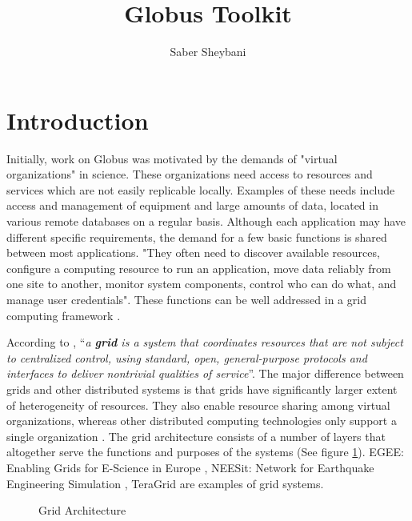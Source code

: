 \documentclass[9pt,twocolumn,twoside]{../../styles/osajnl}
\title{Globus Toolkit}
\author[1,*]{Saber Sheybani}
\affil[1]{School of Informatics and Computing, Bloomington, IN 47408, U.S.A.}
\affil[*]{Corresponding authors: sheybani@indiana.edu}
\begin{document}
 

\maketitle 

\section{Introduction} 

Initially, work on Globus was motivated by the demands of "virtual organizations" in science. These organizations need access to resources and services which are not easily replicable locally. Examples of these needs include access and management of equipment and large amounts of data, located in various remote databases on a regular basis. Although each application may have different specific requirements, the demand for a few basic functions is shared between most applications. "They often need to discover available resources, configure a computing resource to run an application, move data reliably from one site to another, monitor system components, control who can do what, and manage user credentials". These functions can be well addressed in a grid computing framework \cite{foster2006globus}.

According to \cite{sotomayor2006globus}, ``\emph{a \textbf{grid} is a system that coordinates resources that are not subject to centralized control, using standard, open, general-purpose protocols and interfaces to deliver nontrivial qualities of service}''. The major difference between grids and other distributed systems is that grids have significantly larger extent of heterogeneity of resources. They also enable resource sharing among virtual organizations, whereas other distributed computing technologies only support a single organization \cite{magoules2009introduction}. The grid architecture consists of a number of layers that altogether serve the functions and purposes of the systems (See figure \ref{fig:grid-arch}). EGEE: Enabling Grids for E-Science in Europe \cite{egee-web}, NEESit: Network for Earthquake Engineering Simulation \cite{neesit-web}, TeraGrid \cite{teragrid-wiki} are examples of grid systems.
\begin{figure}[htbp]
\centering
{}
\caption{Grid Architecture \cite{sotomayor2006globus}}
\label{fig:grid-arch}
\end{figure}
\end{document}
